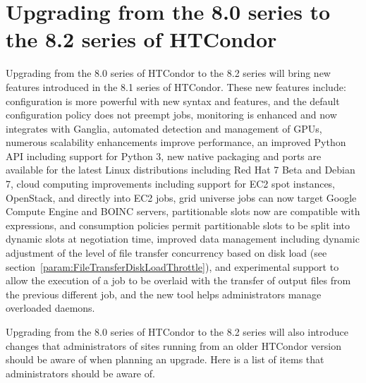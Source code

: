 \section{Upgrading from the 8.0 series to the 8.2 series of HTCondor}\label{sec:to-8.2}

Upgrading from the 8.0 series of HTCondor to the 8.2 series 
will bring new features introduced in the 8.1 series of HTCondor.
These new features include:
configuration is more powerful with new syntax and features, and
the default configuration policy does not preempt jobs,
monitoring is enhanced and now integrates with Ganglia,
automated detection and management of GPUs,
numerous scalability enhancements improve performance,
an improved Python API including support for Python 3,
new native packaging and ports are available for the latest Linux 
distributions including Red Hat 7 Beta and Debian 7,
cloud computing improvements including support for
EC2 spot instances, OpenStack, and  
directly into EC2 jobs,
grid universe jobs can now target Google Compute Engine and BOINC servers,
partitionable slots now are compatible with  
expressions, and consumption policies permit partitionable slots 
to be split into dynamic slots at negotiation time,
improved data management including dynamic adjustment of the level of 
file transfer concurrency based on disk load 
(see section~\ref{param:FileTransferDiskLoadThrottle}), 
and experimental support to allow the execution of a job to be overlaid 
with the transfer of output files from the previous different job,
and
the new  tool helps administrators manage overloaded daemons. 

Upgrading from the 8.0 series of HTCondor to the 8.2 series will
also introduce changes that administrators of sites running from an older
HTCondor version should be aware of when planning an upgrade.  
Here is a list of items that administrators should be aware of.

